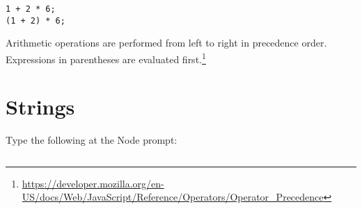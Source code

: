 \documentclass{article}
\begin{document}
\begin{lstlisting}
1 + 2 * 6;
(1 + 2) * 6;
\end{lstlisting}

Arithmetic operations are performed from left to right in precedence order. Expressions in parentheses are evaluated first.\footnote{\url{https://developer.mozilla.org/en-US/docs/Web/JavaScript/Reference/Operators/Operator_Precedence}}

\section{Strings}
Type the following at the Node prompt:

\begin{lstlisting}

\end{lstlisting}
\end{document}
